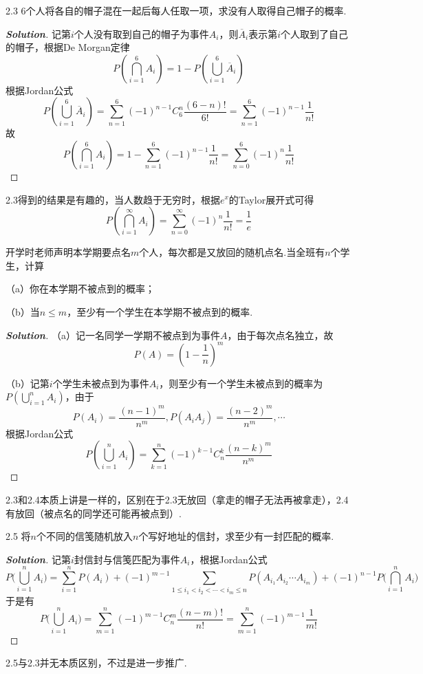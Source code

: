 \documentclass[10pt, a4paper, oneside]{ctexart}
\newenvironment{solution}{\begin{proof}[\bf Solution]}{\end{proof}}
\begin{document}
2.3 $6$个人将各自的帽子混在一起后每人任取一项，求没有人取得自己帽子的概率.
\begin{solution}
记第$i$个人没有取到自己的帽子为事件$A_i$，则$\overline{A}_i$表示第$i$个人取到了自己的帽子，根据De Morgan定律
\[P(\bigcap\limits_{i = 1}^6 {{A_i}} ) = 1 - P(\bigcup\limits_{i = 1}^6 {{{\overline A }_i}} )\]
根据Jordan公式
\[P(\bigcup\limits_{i = 1}^6 {{{\overline A }_i}} ) = \sum\limits_{n = 1}^6 {{{( - 1)}^{n - 1}}C_6^n\frac{{(6 - n)!}}{{6!}}}  = \sum\limits_{n = 1}^6 {{{( - 1)}^{n - 1}}\frac{1}{{n!}}} \]
故
\[P(\bigcap\limits_{i = 1}^6 {{A_i}} ) = 1 - \sum\limits_{n = 1}^6 {{{( - 1)}^{n - 1}}\frac{1}{{n!}}}  = \sum\limits_{n = 0}^6 {{{( - 1)}^n}\frac{1}{{n!}}} \]
\end{solution}
\begin{remark}
2.3得到的结果是有趣的，当人数趋于无穷时，根据$e^x$的Taylor展开式可得
\[P(\bigcap\limits_{i = 1}^\infty  {{A_i}} ) = \sum\limits_{n = 0}^\infty  {{{( - 1)}^n}\frac{1}{{n!}}}  = \frac{1}{e}\]
\end{remark}

 开学时老师声明本学期要点名$m$个人，每次都是又放回的随机点名.当全班有$n$个学生，计算

（a）你在本学期不被点到的概率；

（b）当$n\leqslant m$，至少有一个学生在本学期不被点到的概率.
\begin{solution}
（a）记一名同学一学期不被点到为事件$A$，由于每次点名独立，故
\[P(A) = {\left( {1 - \frac{1}{n}} \right)^m}\]

（b）记第$i$个学生未被点到为事件$A_i$，则至少有一个学生未被点到的概率为$P(\bigcup\limits_{i = 1}^n {{A_i}})$，由于\[P({A_i}) = \frac{{{{(n - 1)}^m}}}{{{n^m}}},P({A_i}{A_j}) = \frac{{{{(n - 2)}^m}}}{{{n^m}}}, \cdots \]根据Jordan公式
\[P(\bigcup\limits_{i = 1}^n {{A_i}} ) = \sum\limits_{k = 1}^n {{{( - 1)}^{k - 1}}} C_n^k\frac{{{{(n - k)}^m}}}{{{n^m}}}\]
\end{solution}
\begin{remark}
2.3和2.4本质上讲是一样的，区别在于2.3无放回（拿走的帽子无法再被拿走），2.4有放回（被点名的同学还可能再被点到）.
\end{remark}

2.5 将$n$个不同的信笺随机放入$n$个写好地址的信封，求至少有一封匹配的概率.
\begin{solution}
记第$i$封信封与信笺匹配为事件$A_i$，根据Jordan公式
\[P(\bigcup\limits_{i = 1}^n {{A_i})}  = \sum\limits_{i = 1}^n {P({A_i})}  + {( - 1)^{m - 1}}\sum\limits_{1 \leqslant {i_1} < {i_2} <  \cdots  < {i_m} \leqslant n} {P({A_{{i_1}}}{A_{{i_2}}} \cdots {A_{{i_m}}})}  + {( - 1)^{n - 1}}P(\bigcap\limits_{i = 1}^n {{A_i})} \]
于是有
\[P(\bigcup\limits_{i = 1}^n {{A_i})}  = \sum\limits_{m = 1}^n {{{( - 1)}^{m - 1}}C_n^m\frac{{(n - m)!}}{{n!}}}  = \sum\limits_{m = 1}^n {{{( - 1)}^{m - 1}}\frac{1}{{m!}}} \]
\end{solution}
\begin{remark}
2.5与2.3并无本质区别，不过是进一步推广.
\end{remark}
\end{document}
